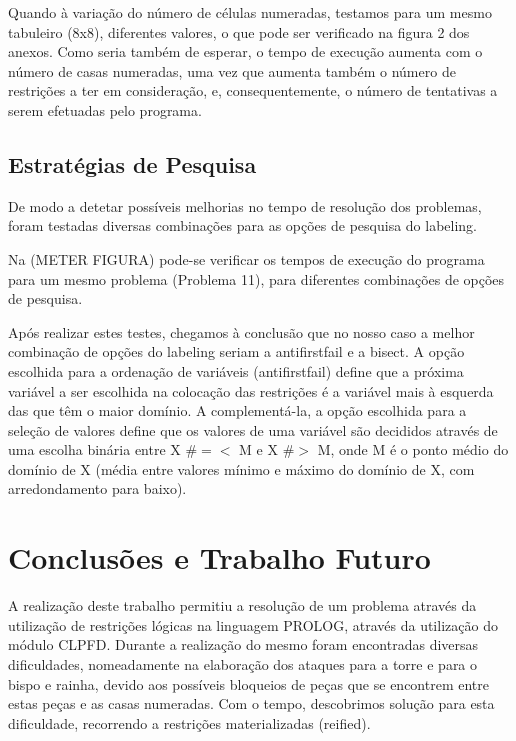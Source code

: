 \documentclass[runningheads]{llncs}
\begin{document}
Quando à variação do número de células numeradas, testamos para um mesmo tabuleiro (8x8), diferentes valores, o que pode ser verificado na figura 2 dos anexos.
Como seria também de esperar, o tempo de execução aumenta com o número de casas numeradas, uma vez que aumenta também o número de restrições a ter em consideração, e, consequentemente, o número de tentativas a serem efetuadas pelo programa.

\subsection{Estratégias de Pesquisa}

De modo a detetar possíveis melhorias no tempo de resolução dos problemas, foram testadas diversas combinações para as opções de pesquisa do labeling. 

Na (METER FIGURA) pode-se verificar os tempos de execução do programa para um mesmo problema (Problema 11), para diferentes combinações de opções de pesquisa.

Após realizar estes testes, chegamos à conclusão que no nosso caso a melhor combinação de opções do labeling seriam a anti\textunderscore first\textunderscore fail e
 a bisect.
A opção escolhida para a ordenação de variáveis (anti\textunderscore first\textunderscore fail) define que a próxima variável a ser escolhida na colocação 
das restrições é a variável mais à esquerda das que têm o maior domínio.
A complementá-la, a opção escolhida para a seleção de valores define que os valores de uma 
variável são decididos através de uma escolha binária entre X  \#$=<$ M e X  \#$>$ M, onde M 
é o ponto médio do domínio de X (média entre valores mínimo e máximo do domínio de X, 
com arredondamento para baixo).

\newpage
\section{Conclusões e Trabalho Futuro}

A realização deste trabalho permitiu a resolução de um problema através da utilização de restrições lógicas na linguagem PROLOG,
através da utilização do módulo CLPFD.
Durante a realização do mesmo foram encontradas diversas dificuldades, nomeadamente na elaboração dos ataques para a torre e para o bispo e rainha, devido aos possíveis bloqueios de peças que se encontrem entre estas peças e as casas numeradas.
Com o tempo, descobrimos solução para esta dificuldade, recorrendo a restrições materializadas (reified).
\end{document}
